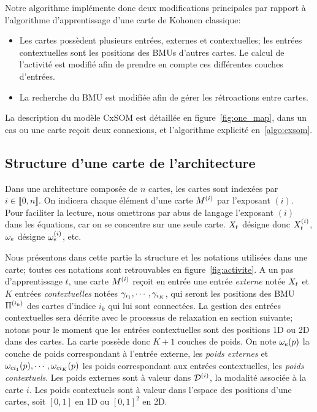 Notre algorithme implémente donc deux modifications principales par rapport à l'algorithme d'apprentissage d'une carte de Kohonen classique: 
\begin{itemize}
\item Les cartes possèdent plusieurs entrées, externes et contextuelles; les entrées contextuelles sont les positions des BMUs d'autres cartes. Le calcul de l'activité est modifié afin de prendre en compte ces différentes couches d'entrées.
\item La recherche du BMU est modifiée afin de gérer les rétroactions entre cartes.
\end{itemize}

La description du modèle CxSOM est détaillée en figure~\ref{fig:one_map}, dans un cas ou une carte reçoit deux connexions, et l'algorithme explicité en~\ref{algo:cxsom}.

\subsection{Structure d'une carte de l'architecture}
Dans une architecture composée de $n$ cartes, les cartes sont indexées par $i \in \llbracket 0,n \rrbracket$. On indicera chaque élément d'une carte $M^{({i})}$ par l'exposant $(i)$. Pour faciliter la lecture, nous omettrons par abus de langage l'exposant $(i)$ dans les équations, car on se concentre sur une seule carte. $X_t$ désigne donc $X_t^{({i})}$, $\omega_e$ désigne $\omega_e^{({i})}$, etc.


Nous présentons dans cette partie la structure et les notations utilisées dans une carte; toutes ces notations sont retrouvables en figure~\ref{fig:activite}.
A un pas d'apprentissage $t$, une carte $M^{({i})}$ reçoit en entrée une entrée \emph{externe} notée $X_t$ et $K$ entrées \emph{contextuelles} notées $\gamma_{i_1},\cdots,\gamma_{i_K}$, qui seront les positions des BMU $\Pi^{({i_k})}$ des cartes d'indice $i_k$ qui lui sont connectées. La gestion des entrées contextuelles sera décrite avec le processus de relaxation en section suivante; notons pour le moment que les entrées contextuelles sont des positions 1D ou 2D dans des cartes. 
La carte possède donc $K+1$ couches de poids. On  note $\omega_e(p)$ la couche de poids correspondant à l'entrée externe, les \emph{poids externes} et $\omega_{ci_1}(p), \cdots, \omega_{ci_K}(p)$ les poids correspondant aux entrées contextuelles, les \emph{poids contextuels}. Les poids externes sont à valeur dans $\mathcal{D}^{({i})}$, la modalité associée à la carte $i$. Les poids contextuels sont à valeur dans l'espace des positions d'une cartes, soit $[0,1]$ en 1D ou $[0,1]^2$ en 2D.


